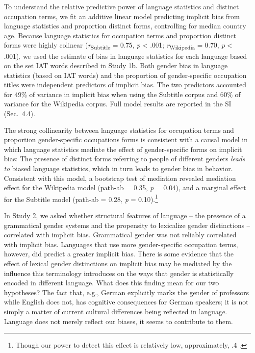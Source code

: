 \documentclass[9pt,twocolumn,twoside,lineno]{pnas-new}
\begin{document}
To understand the relative predictive power of language statistics and
distinct occupation terms, we fit an additive linear model predicting implicit bias
from language statistics and proportion distinct forms, controlling for
median country age. Because language statistics for occupation terms and
proportion distinct forms were highly colinear (\emph{r}\textsubscript{Subtitle}  = 0.75, \emph{p}
\textless{} .001; \emph{r}\textsubscript{Wikipedia} =
0.70, \emph{p} \textless{} .001), we used the estimate of bias in language statistics
for each language based on the set IAT words described in Study 1b. Both
gender bias in language statistics (based on IAT words) and the
proportion of gender-specific occupation titles were independent
predictors of implicit bias. The two predictors accounted for 49\% of
variance in implicit bias when using the Subtitle corpus and 60\% of
variance for the Wikipedia corpus. Full model results are reported in
the SI (Sec.\ 4.4).

The strong collinearity between language statistics for
occupation terms and proportion gender-specific occupations forms is
consistent with a causal model in which language statistics mediate the
effect of gender-specific forms on implicit bias: The presence of
distinct forms referring to people of different genders \emph{leads to}
biased language statistics, which in turn leads to gender bias in
behavior. Consistent with this model, a bootstrap test of mediation
revealed mediation effect for the
Wikipedia model (path-ab = 0.35, \emph{p} =
0.04), and a marginal effect for the Subtitle model (path-ab = 0.28,
\emph{p} = 0.10).\footnote{Though our power to detect this effect is relatively low, approximately, .4 \citep[ref.\,][]{schoemann2017determining}.}

In Study 2, we asked whether structural features of language -- the
presence of a grammatical gender systems and the propensity to
lexicalize gender distinctions -- correlated with implicit bias.
Grammatical gender was not reliably correlated with implicit bias.
Languages that use more gender-specific occupation terms, however, did
predict a greater implicit bias. There is some evidence that the effect
of lexical gender distinctions on implicit bias may be mediated by the
influence this terminology introduces on the ways that gender is
statistically encoded in different language. What does this finding mean
for our two hypotheses? The fact that, e.g., German explicitly marks the
gender of professors while English does not, has cognitive consequences
for German speakers; it is not simply a matter of current cultural
differences being reflected in language. Language does not merely
reflect our biases, it seems to contribute to them.
\end{document}
